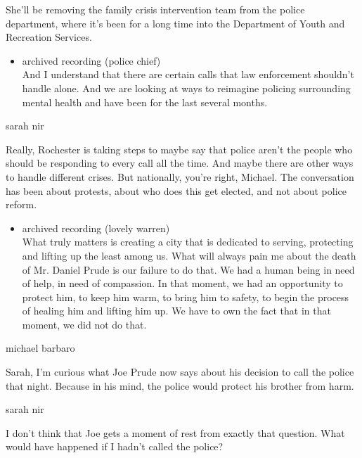 She'll be removing the family crisis intervention team from the police
department, where it's been for a long time into the Department of Youth
and Recreation Services.

\begin{itemize}
\tightlist
\item
  archived recording (police chief)\\
  And I understand that there are certain calls that law enforcement
  shouldn't handle alone. And we are looking at ways to reimagine
  policing surrounding mental health and have been for the last several
  months.
\end{itemize}

sarah nir

Really, Rochester is taking steps to maybe say that police aren't the
people who should be responding to every call all the time. And maybe
there are other ways to handle different crises. But nationally, you're
right, Michael. The conversation has been about protests, about who does
this get elected, and not about police reform.

\begin{itemize}
\tightlist
\item
  archived recording (lovely warren)\\
  What truly matters is creating a city that is dedicated to serving,
  protecting and lifting up the least among us. What will always pain me
  about the death of Mr. Daniel Prude is our failure to do that. We had
  a human being in need of help, in need of compassion. In that moment,
  we had an opportunity to protect him, to keep him warm, to bring him
  to safety, to begin the process of healing him and lifting him up. We
  have to own the fact that in that moment, we did not do that.
\end{itemize}

michael barbaro

Sarah, I'm curious what Joe Prude now says about his decision to call
the police that night. Because in his mind, the police would protect his
brother from harm.

sarah nir

I don't think that Joe gets a moment of rest from exactly that question.
What would have happened if I hadn't called the police?

